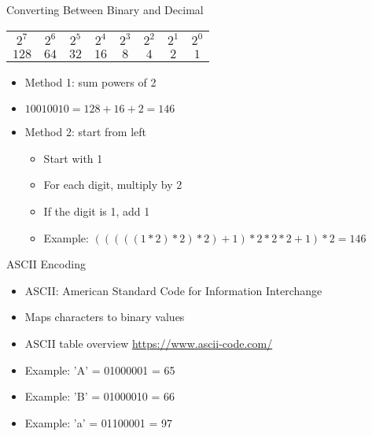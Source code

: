 \begin{withoutheadline}
\begin{frame}{Converting Between Binary and Decimal}
\ttfamily
\begin{tabular}{c|c|c|c|c|c|c|c}
    $2^7$ & $2^6$ & $2^5$ & $2^4$ & $2^3$ & $2^2$ & $2^1$ & $2^0$ \\
    $128$ & $64$  & $32$  & $16$  & $8$   & $4$   & $2$   & $1$   \\
\end{tabular}

\begin{itemize}
    \item Method 1: sum powers of 2
    \item $10010010 = 128 + 16 + 2 = 146$
    \item Method 2: start from left
    \begin{itemize}
        \item Start with 1
        \item For each digit, multiply by 2
        \item If the digit is 1, add 1
        \item Example: $(((((1 * 2) * 2) * 2) + 1) * 2 * 2 * 2 + 1) * 2 = 146$
    \end{itemize}
\end{itemize}
\end{frame}

\begin{frame}{ASCII Encoding}
\begin{itemize}
    \item ASCII: American Standard Code for Information Interchange
    \item Maps characters to binary values
    \item ASCII table overview \url{https://www.ascii-code.com/}
    \item Example: 'A' = 01000001 = 65
    \item Example: 'B' = 01000010 = 66
    \item Example: 'a' = 01100001 = 97
\end{itemize}
\end{frame}


\end{withoutheadline}
